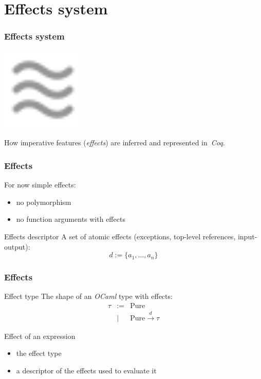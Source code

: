 \documentclass[hyperref={pdfpagelabels=false}]{beamer}
\begin{document}
  \section{Effects system}
  \begin{frame}
    \frametitle{Effects system}
    \begin{center}
      \includegraphics[width=4cm]{images/effects}
    \end{center}
    \begin{center}
      How imperative features (\emph{effects}) are inferred and represented in~\emph{Coq}.
    \end{center}
  \end{frame}
  \begin{frame}
    \frametitle{Effects}
    For now simple effects:
    \begin{itemize}
      \item no polymorphism
      \item no function arguments with effects
    \end{itemize}
    \begin{block}{Effects descriptor}
      A set of atomic effects (exceptions, top-level references, input-output):
      \[
        d := \{ a_1, \dots, a_n \}
      \]
    \end{block}
  \end{frame}
  \begin{frame}
    \frametitle{Effects}
    \begin{block}{Effect type}
      The shape of an \emph{OCaml} type with effects:
      \[
        \begin{array}{rcl}
          \tau &:=& \mathrm{Pure}\\
               &|& \mathrm{Pure} \xrightarrow{d} \tau
        \end{array}
      \]
    \end{block}
    \begin{block}{Effect of an expression}
      \begin{itemize}
        \item the effect type
        \item a descriptor of the effects used to evaluate it
      \end{itemize}
    \end{block}
  \end{frame}
\end{document}
